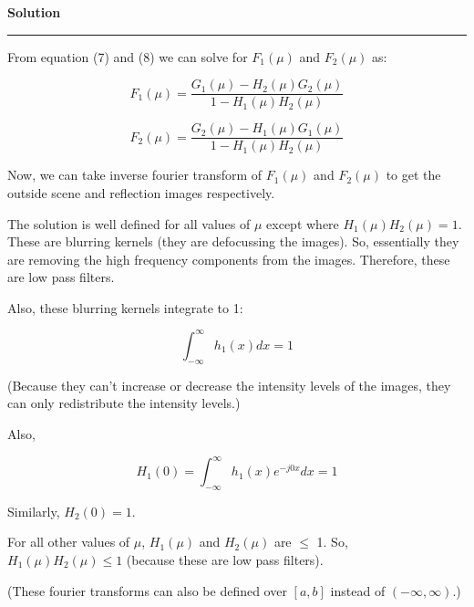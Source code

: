 \documentclass[a4paper,14pt]{article}
\newenvironment{solution}[2][]{%
    \begin{mdframed}[linecolor=blue!70!black, linewidth=2pt, roundcorner=10pt, backgroundcolor=yellow!10!white, skipabove=12pt, skipbelow=12pt]%
        \textbf{\large #2}
        \par\noindent\rule{\textwidth}{0.4pt}
}{
    \end{mdframed}
}
\begin{document}
\begin{solution}{Solution}
From equation (7) and (8) we can solve for $F_1(\mu)$ and $F_2(\mu)$ as:

\begin{equation}
    F_1(\mu) = \frac{G_1(\mu) - H_2(\mu)G_2(\mu)}{1 - H_1(\mu)H_2(\mu)}
\end{equation}

\begin{equation}
    F_2(\mu) = \frac{G_2(\mu) - H_1(\mu)G_1(\mu)}{1 - H_1(\mu)H_2(\mu)}
\end{equation}

Now, we can take inverse fourier transform of $F_1(\mu)$ and $F_2(\mu)$ to get the outside scene and reflection images respectively.


The solution is well defined for all values of $\mu$ except where $H_1(\mu)H_2(\mu) = 1$. These are blurring kernels (they are defocussing the images). So, essentially they are removing the high frequency components from the images. Therefore, these are low pass filters.


Also, these blurring kernels integrate to 1:

\begin{equation}
  \int_{-\infty}^{\infty} h_1 (x) dx = 1
\end{equation}

(Because they can't increase or decrease the intensity levels of the images, they can only redistribute the intensity levels.)

Also, 

\begin{equation}
  H_1(0) = \int_{-\infty}^{\infty} h_1 (x) e^{-j0x} dx = 1
\end{equation}

Similarly, $H_2(0) = 1$.

For all other values of $\mu$, $H_1(\mu)$ and $H_2(\mu)$ are $\leq$ 1. So, $H_1(\mu)H_2(\mu) \leq 1$ (because these are low pass filters).

(These fourier transforms can also be defined over $[a, b]$ instead of $(-\infty, \infty)$.)






\end{solution}
\end{document}
